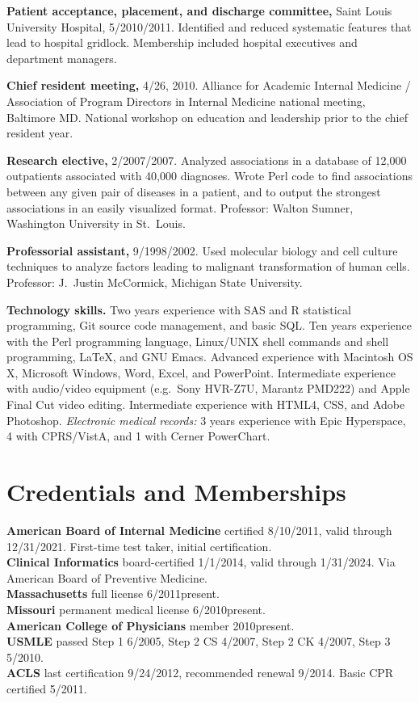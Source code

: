 \documentclass[12pt]{article}
\begin{document}
\textbf{Patient acceptance, placement, and discharge committee,} Saint
Louis University Hospital, 5/2010\ndash{}/2011. Identified
and reduced systematic features that lead to hospital gridlock.
Membership included hospital executives and department managers.


\textbf{Chief resident meeting,} 4/26, 2010. Alliance for
Academic Internal Medicine / Association of Program Directors in
Internal Medicine national meeting, Baltimore MD. National workshop on
education and leadership prior to the chief resident year.

\textbf{Research elective,} 2/2007/2007. Analyzed associations
in a database of 12,000 outpatients associated with 40,000 diagnoses.
Wrote Perl code to find associations between any given pair of
diseases in a patient, and to output the strongest associations in an
easily visualized format. Professor: Walton Sumner, Washington
University in St.\ Louis.

\textbf{Professorial assistant,} 9/1998/2002. Used molecular
biology and cell culture techniques to analyze factors leading to
malignant transformation of human cells. Professor: J.\ Justin
McCormick, Michigan State University.

\textbf{Technology skills.} Two years experience with SAS and R
statistical programming, Git source code management, and basic SQL.
Ten years experience with the Perl programming language, Linux/UNIX
shell commands and shell programming, \LaTeX, and GNU Emacs. Advanced
experience with Macintosh OS X, Microsoft Windows, Word, Excel, and
PowerPoint. Intermediate experience with audio/video equipment
(e.g.\ Sony HVR-Z7U, Marantz PMD222) and Apple Final Cut video
editing. Intermediate experience with HTML4, CSS, and Adobe Photoshop.
\emph{Electronic medical records:} 3 years experience with Epic
Hyperspace, 4 with CPRS/VistA, and 1 with Cerner PowerChart.


\section*{Credentials and Memberships}

\textbf{American Board of Internal Medicine} certified 8/10/2011,
valid through 12/31/2021. First-time test taker, initial
certification.\\
\textbf{Clinical Informatics} board-certified 1/1/2014, valid through
1/31/2024. Via American Board of Preventive Medicine.\\
\textbf{Massachusetts} full license 6/2011\ndash{}present.\\
\textbf{Missouri} permanent medical license 6/2010\ndash{}present.\\
\textbf{American College of Physicians} member 2010\ndash{}present.\\
\textbf{USMLE} passed Step 1 6/2005, Step 2 CS 4/2007, Step 2 CK 4/2007, Step 3
5/2010.\\
\textbf{ACLS} last certification 9/24/2012, recommended renewal
9/2014. Basic CPR certified 5/2011.
\end{document}
